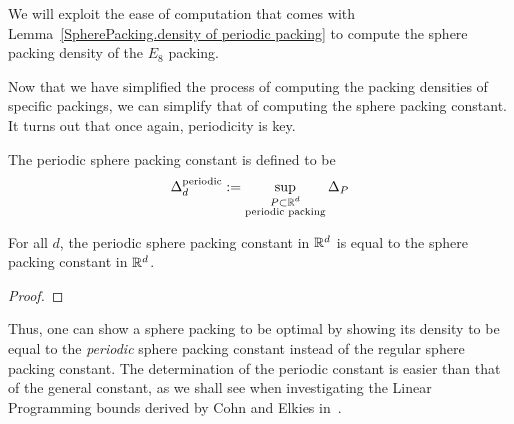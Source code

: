 We will exploit the ease of computation that comes with Lemma~\ref{SpherePacking.density of periodic packing} to compute the sphere packing density of the $E_8$ packing.

Now that we have simplified the process of computing the packing densities of specific packings, we can simplify that of computing the sphere packing constant. It turns out that once again, periodicity is key.

\begin{definition}\label{def-Periodic-sphere-packing-constant}\notready
    The periodic sphere packing constant is defined to be
    $$ \Delta_{d}^{\text{periodic}} := \sup_{\substack{P \subset \mathbb{R}^d \\ \text{periodic packing}}} \Delta_P$$
\end{definition}

\begin{theorem}\label{periodic-packing-optimal}\notready
    For all $d$, the periodic sphere packing constant in $\mathbb{R}^d$ is equal to the sphere packing constant in $\mathbb{R}^d$.
\end{theorem}
\begin{proof}
\end{proof}

Thus, one can show a sphere packing to be optimal by showing its density to be equal to the \emph{periodic} sphere packing constant instead of the regular sphere packing constant. The determination of the periodic constant is easier than that of the general constant, as we shall see when investigating the Linear Programming bounds derived by Cohn and Elkies in~\cite{ElkiesCohn}.
